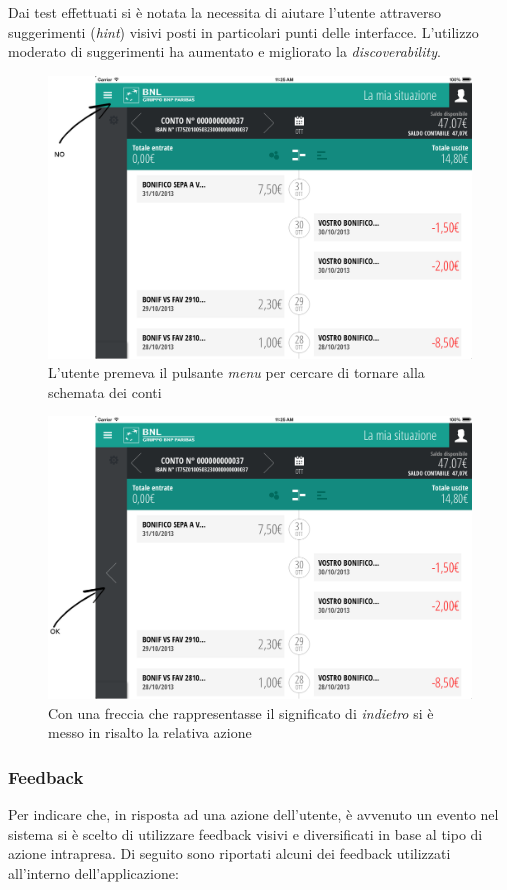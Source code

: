 Dai test effettuati si è notata la necessita di aiutare l'utente attraverso suggerimenti (\emph{hint}) visivi posti in particolari punti delle interfacce. L'utilizzo moderato di suggerimenti ha aumentato e migliorato la \emph{discoverability}. 
\begin{figure}[!htbp]
\centering
\includegraphics[scale=0.30]{ux/timelinenohint.png}
\caption{L'utente premeva il pulsante \emph{menu} per cercare di tornare alla schemata dei conti}
\end{figure}
\begin{figure}[!htbp]
\centering
\includegraphics[scale=0.30]{ux/timelinehint.png}
\caption{Con una freccia che rappresentasse il significato di \emph{indietro} si è messo in risalto la relativa azione}
\end{figure}

\subsubsection{Feedback}
Per indicare che, in risposta ad una azione dell'utente, è avvenuto un evento nel sistema  si è scelto di utilizzare feedback visivi e diversificati in base al tipo di azione intrapresa. 
Di seguito sono riportati alcuni dei feedback utilizzati all'interno dell'applicazione:

